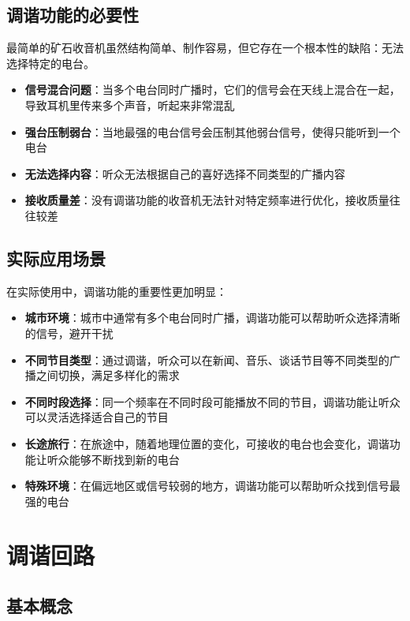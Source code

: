 \documentclass[12pt,UTF8]{ctexbook}
\begin{document}
\subsection{调谐功能的必要性}

最简单的矿石收音机虽然结构简单、制作容易，但它存在一个根本性的缺陷：无法选择特定的电台。

\begin{itemize}[leftmargin=3.5em]
    \item \textbf{信号混合问题}：当多个电台同时广播时，它们的信号会在天线上混合在一起，导致耳机里传来多个声音，听起来非常混乱
    \item \textbf{强台压制弱台}：当地最强的电台信号会压制其他弱台信号，使得只能听到一个电台
    \item \textbf{无法选择内容}：听众无法根据自己的喜好选择不同类型的广播内容
    \item \textbf{接收质量差}：没有调谐功能的收音机无法针对特定频率进行优化，接收质量往往较差
\end{itemize}

\subsection{实际应用场景}

在实际使用中，调谐功能的重要性更加明显：

\begin{itemize}[leftmargin=3.5em]
    \item \textbf{城市环境}：城市中通常有多个电台同时广播，调谐功能可以帮助听众选择清晰的信号，避开干扰
    \item \textbf{不同节目类型}：通过调谐，听众可以在新闻、音乐、谈话节目等不同类型的广播之间切换，满足多样化的需求
    \item \textbf{不同时段选择}：同一个频率在不同时段可能播放不同的节目，调谐功能让听众可以灵活选择适合自己的节目
    \item \textbf{长途旅行}：在旅途中，随着地理位置的变化，可接收的电台也会变化，调谐功能让听众能够不断找到新的电台
    \item \textbf{特殊环境}：在偏远地区或信号较弱的地方，调谐功能可以帮助听众找到信号最强的电台
\end{itemize}

\section{调谐回路}

\subsection{基本概念}
\end{document}
